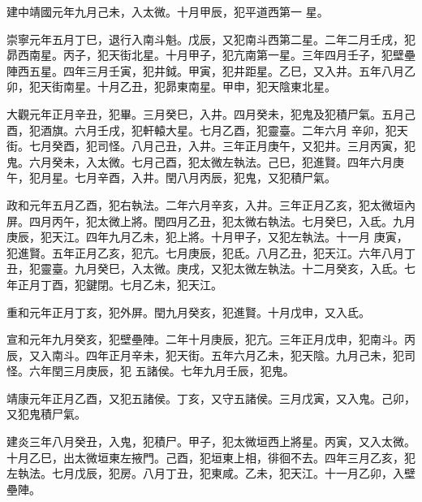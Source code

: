 \begin{pinyinscope}
 建中靖國元年九月己未，入太微。十月甲辰，犯平道西第一
 星。



 崇寧元年五月丁巳，退行入南斗魁。戊辰，又犯南斗西第二星。二年二月壬戌，犯昴西南星。丙子，犯天街北星。十月甲子，犯亢南第一星。三年四月壬子，犯壁壘陣西五星。四年三月壬寅，犯井鉞。甲寅，犯井距星。乙巳，又入井。五年八月乙卯，犯天街南星。十月乙丑，犯昴東南星。甲申，犯天陰東北星。



 大觀元年正月辛丑，犯畢。三月癸巳，入井。四月癸未，犯鬼及犯積尸氣。五月己酉，犯酒旗。六月壬戌，犯軒轅大星。七月乙酉，犯靈臺。二年六月
 辛卯，犯天街。七月癸酉，犯司怪。八月己丑，入井。三年正月庚午，又犯井。三月丙寅，犯鬼。六月癸未，入太微。七月己酉，犯太微左執法。己巳，犯進賢。四年六月庚午，犯月星。七月辛酉，入井。閏八月丙辰，犯鬼，又犯積尸氣。



 政和元年五月乙酉，犯右執法。二年六月辛亥，入井。三年正月乙亥，犯太微垣內屏。四月丙午，犯太微上將。閏四月乙丑，犯太微右執法。七月癸巳，入氐。九月庚辰，犯天江。四年九月乙未，犯上將。十月甲子，又犯左執法。十一月
 庚寅，犯進賢。五年正月乙亥，犯亢。七月庚辰，犯氐。八月乙丑，犯天江。六年八月丁丑，犯靈臺。九月癸巳，入太微。庚戌，又犯太微左執法。十二月癸亥，入氐。七年正月丁酉，犯鍵閉。七月乙未，犯天江。



 重和元年正月丁亥，犯外屏。閏九月癸亥，犯進賢。十月戊申，又入氐。



 宣和元年九月癸亥，犯壁壘陣。二年十月庚辰，犯亢。三年正月戊申，犯南斗。丙辰，又入南斗。四年正月辛未，犯天街。五年六月乙未，犯天陰。九月己未，犯司怪。六年閏三月庚辰，犯
 五諸侯。七年九月壬辰，犯鬼。



 靖康元年正月乙酉，又犯五諸侯。丁亥，又守五諸侯。三月戊寅，又入鬼。己卯，又犯鬼積尸氣。



 建炎三年八月癸丑，入鬼，犯積尸。甲子，犯太微垣西上將星。丙寅，又入太微。十月乙巳，出太微垣東左掖門。己酉，犯垣東上相，徘徊不去。四年三月乙亥，犯左執法。七月戊辰，犯房。八月丁丑，犯東咸。乙未，犯天江。十一月乙卯，入壁壘陣。




\end{pinyinscope}
